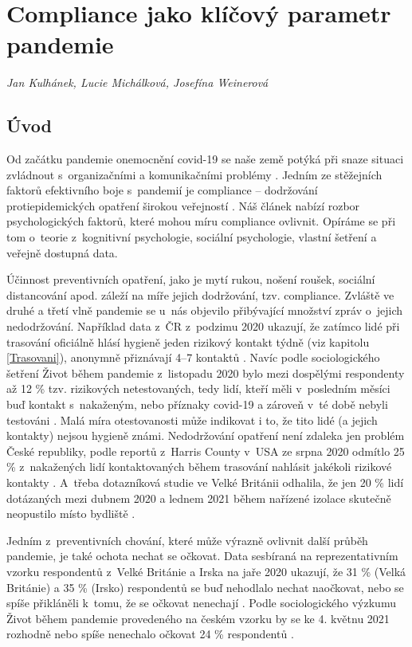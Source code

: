 \chapter{Compliance jako klíčový parametr pandemie}
\label{Compliance}

\textit{Jan Kulhánek, Lucie Michálková, Josefína Weinerová}
\vspace{15mm}

\section*{Úvod} 

Od začátku pandemie onemocnění covid-19 se naše země potýká při snaze situaci zvládnout s~organizačními a komunikačními problémy \cite{CeskaTiskovaKancelar2020,Vlckova2020}. Jedním ze stěžejních faktorů efektivního boje s~pandemií je compliance -- dodržování protiepidemických opatření širokou veřejností \cite{VanRooij2020}. Náš článek nabízí rozbor psychologických faktorů, které mohou míru compliance ovlivnit. Opíráme se při tom o~teorie z~kognitivní psychologie, sociální psychologie, vlastní šetření a veřejně dostupná data. 

Účinnost preventivních opatření, jako je mytí rukou, nošení roušek, sociální distancování apod. záleží na míře jejich dodržování, tzv. compliance. Zvláště ve druhé a třetí vlně pandemie se u~nás objevilo přibývající množství zpráv o~jejich nedodržování. Například data z~ČR z~podzimu 2020 ukazují, že zatímco lidé při trasování oficiálně hlásí hygieně jeden rizikový kontakt týdně (viz kapitolu \ref{Trasovani}), anonymně přiznávají 4--7 kontaktů \cite{tr_PAQ01}. Navíc podle sociologického šetření Život během pandemie z~listopadu 2020 bylo mezi dospělými respondenty až 12 \% tzv. rizikových netestovaných, tedy lidí, kteří měli v~posledním měsíci buď kontakt s~nakaženým, nebo příznaky covid-19 a zároveň v~té době nebyli testováni \cite{Prokop2020a}. Malá míra otestovanosti může indikovat i to, že tito lidé (a jejich kontakty) nejsou hygieně známi. Nedodržování opatření není zdaleka jen problém České republiky, podle reportů z~Harris County v~USA ze srpna 2020 odmítlo 25 \% z~nakažených lidí kontaktovaných během trasování nahlásit jakékoli rizikové kontakty \cite{Shapiro2020}. A~třeba dotazníková studie ve Velké Británii odhalila, že jen 20 \% lidí dotázaných mezi dubnem 2020 a lednem 2021 během nařízené izolace skutečně neopustilo místo bydliště \cite{Smith2021}.

Jedním z~preventivních chování, které může výrazně ovlivnit další průběh pandemie, je také ochota nechat se očkovat. Data sesbíraná na reprezentativním vzorku respondentů z~Velké Británie a Irska na jaře 2020 ukazují, že 31 \% (Velká Británie) a 35 \% (Irsko) respondentů se buď nehodlalo nechat naočkovat, nebo se spíše přikláněli k~tomu, že se očkovat nenechají \cite{Murphy2021}. Podle sociologického výzkumu Život během pandemie provedeného na českém vzorku by se ke 4. květnu 2021 rozhodně nebo spíše nenechalo očkovat 24 \% respondentů \cite{Prokop2021}.

